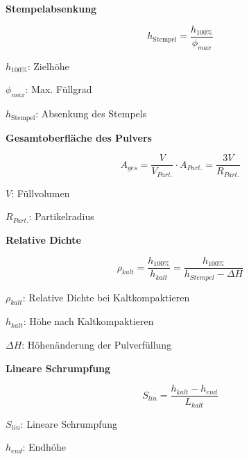 
\textbf{Stempelabsenkung}\\

\begin{minipage}{0.5\linewidth}
    \[
    \boxed{     
        h_{\text{Stempel}} = \frac{h_{100 \%}}{\phi_{max}}
    }
    \]
\end{minipage}
\begin{minipage}{0.5\linewidth}
    \item $h_{100\%}$: Zielhöhe
    \item $\phi_{max}$: Max. Füllgrad
    \item $h_{\text{Stempel}}$: Absenkung des Stempels
\end{minipage}
\vspace{1mm}

\textbf{Gesamtoberfläche des Pulvers}\\

\begin{minipage}{0.65\linewidth}
    \[
    \boxed{     
        A_{ges} = \frac{V}{V_{Part.}} \cdot A_{Part.} = \frac{3V}{R_{Part.}}
    }
    \]
\end{minipage}
\begin{minipage}{0.3\linewidth}
    \item $V$: Füllvolumen
    \item $R_{Part.}$: Partikelradius
\end{minipage}
\vspace{1mm}

\textbf{Relative Dichte}\\

\begin{minipage}{0.65\linewidth}
    \[
    \boxed{     
        \rho_{kalt} = \frac{h_{100\%}}{h_{kalt}}= \frac{h_{100\%}}{h_{Stempel} - \Delta H}
    }
    \]
\end{minipage}
\begin{minipage}{0.34\linewidth}
    \item $\rho_{kalt}$: Relative Dichte bei Kaltkompaktieren
    \item $h_{kalt}$: Höhe nach Kaltkompaktieren
    \item $\Delta H$: Höhenänderung der Pulverfüllung
\end{minipage}
\vspace{1mm}

\textbf{Lineare Schrumpfung}\\

\begin{minipage}{0.65\linewidth}
    \[
    \boxed{     
        S_{lin} = \frac{h_{kalt} - h_{end}}{L_{kalt}}
    }
    \]
\end{minipage}
\begin{minipage}{0.3\linewidth}
    \item $S_{lin}$: Lineare Schrumpfung
    \item $h_{end}$: Endhöhe
\end{minipage}
\vspace{1mm}


